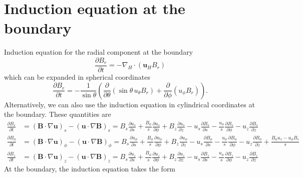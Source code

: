\section{Induction equation at the boundary}

Induction equation for the radial component at the boundary
\begin{equation}\label{eqn:boundary-stirring}
    \frac{\partial B_r}{\partial t} = -\nabla_H \cdot (\mathbf{u}_H B_r)
\end{equation}
which can be expanded in spherical coordinates
\[
    \frac{\partial B_r}{\partial t} = - \frac{1}{\sin\theta} \left(\frac{\partial}{\partial\theta} \left(\sin\theta \, u_\theta B_r\right) + \frac{\partial}{\partial \phi} \left(u_\phi B_r\right)\right).
\]
Alternatively, we can also use the induction equation in cylindrical coordinates at the boundary. These quantities are 
\begin{equation}
\begin{aligned}
    \frac{\partial B_s}{\partial t} &= \left(\mathbf{B}\cdot \nabla \mathbf{u}\right)_s - \left(\mathbf{u}\cdot \nabla\mathbf{B}\right)_s
    = B_s \frac{\partial u_s}{\partial s} + \frac{B_\phi}{s} \frac{\partial u_s}{\partial \phi} + B_z \frac{\partial u_s}{\partial z} - u_s \frac{\partial B_s}{\partial s} - \frac{u_\phi}{s} \frac{\partial B_s}{\partial \phi} - u_z \frac{\partial B_s}{\partial z} \\ 
    \frac{\partial B_\phi}{\partial t} &= \left(\mathbf{B}\cdot \nabla \mathbf{u}\right)_\phi - \left(\mathbf{u}\cdot \nabla\mathbf{B}\right)_\phi
    = B_s \frac{\partial u_\phi}{\partial s} + \frac{B_\phi}{s} \frac{\partial u_\phi}{\partial \phi} + B_z \frac{\partial u_\phi}{\partial z} - u_s \frac{\partial B_\phi}{\partial s} - \frac{u_\phi}{s} \frac{\partial B_\phi}{\partial \phi} - u_z \frac{\partial B_\phi}{\partial z} + \frac{B_\phi u_s - u_\phi B_s}{s}\\ 
    \frac{\partial B_z}{\partial t} &= \left(\mathbf{B}\cdot \nabla \mathbf{u}\right)_z - \left(\mathbf{u}\cdot \nabla\mathbf{B}\right)_z
    = B_s \frac{\partial u_z}{\partial s} + \frac{B_\phi}{s} \frac{\partial u_z}{\partial \phi} + B_z \frac{\partial u_z}{\partial z} - u_s \frac{\partial B_z}{\partial s} - \frac{u_\phi}{s} \frac{\partial B_z}{\partial \phi} - u_z \frac{\partial B_z}{\partial z}
\end{aligned}
\end{equation}
At the boundary, the induction equation takes the form
